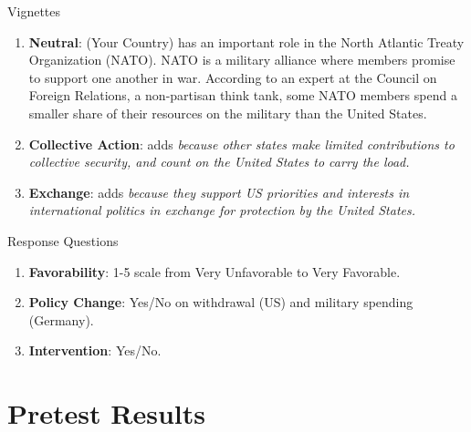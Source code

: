 \documentclass[12pt]{beamer}
\begin{document}

\begin{frame}{Vignettes}


\begin{enumerate}

\item \textbf{Neutral}: (Your Country) has an important role in the North Atlantic Treaty Organization (NATO). NATO is a military alliance where members promise to support one another in war. According to an expert at the Council on Foreign Relations, a non-partisan think tank, some NATO members spend a smaller share of their resources on the military than the United States. 
\pause
\item \textbf{Collective Action}: adds \textit{because other states make limited contributions to collective security, and count on the United States to carry the load.} 
\pause
\item \textbf{Exchange}: adds \textit{because they support US priorities and interests in international politics in exchange for protection by the United States.}
 
\end{enumerate} 

\end{frame} 



\begin{frame}{Response Questions}


\begin{enumerate}

\item \textbf{Favorability}: 1-5 scale from Very Unfavorable to Very Favorable.  
\pause 
\item \textbf{Policy Change}: Yes/No on withdrawal (US) and military spending (Germany). 
\pause 
\item \textbf{Intervention}: Yes/No. 
 
\end{enumerate} 

\end{frame} 




\section{Pretest Results} 
\end{document}
